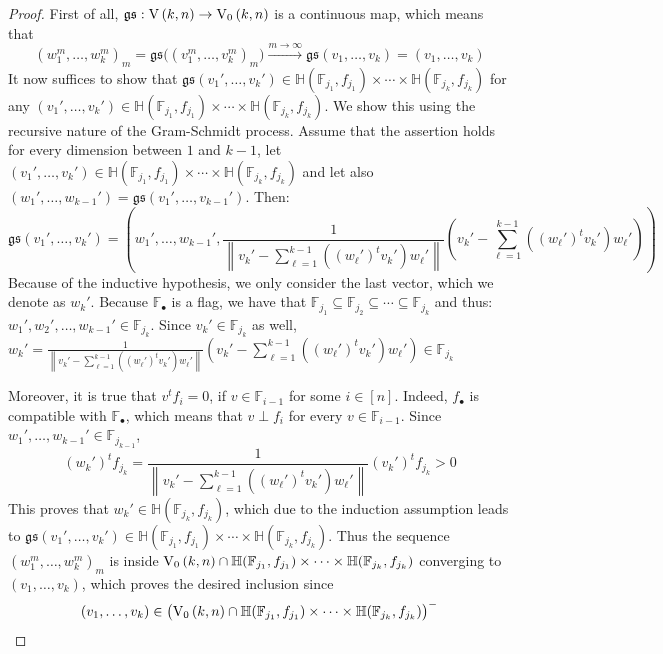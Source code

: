 \begin{proof}
First of all, $\mathfrak{gs}:\St{k}{n}\to\StO{k}{n}$ is a continuous map, which means that
\[{(w_1^m,\ldots,w_k^m)}_m=\mathfrak{gs}\big({(v_1^m,\ldots,v_k^m)}_m\big)\overset{m\to\infty}{\to}\mathfrak{gs}(v_1,\ldots,v_k)=(v_1,\ldots,v_k)\]
It now suffices to show that $\mathfrak{gs}(v_1',\ldots,v_k')\in\mathbb{H}(\mathbb{F}_{j_1},f_{j_1})\times\cdots\times\mathbb{H}(\mathbb{F}_{j_k},f_{j_k})$ for any $(v_1',\ldots,v_k')\in\mathbb{H}(\mathbb{F}_{j_1},f_{j_1})\times\cdots\times\mathbb{H}(\mathbb{F}_{j_k},f_{j_k})$. We show this using the recursive nature of the Gram-Schmidt process. Assume that the assertion holds for every dimension between $1$ and $k-1$, let $(v_1',\ldots,v_k')\in\mathbb{H}(\mathbb{F}_{j_1},f_{j_1})\times\cdots\times\mathbb{H}(\mathbb{F}_{j_k},f_{j_k})$ and let also $(w_1',\ldots,w_{k-1}')=\mathfrak{gs}(v_1',\ldots,v_{k-1}')$. Then:
\[\mathfrak{gs}(v_1',\ldots,v_k')=\left(w_1',\ldots,w_{k-1}',\frac{1}{\left\|v_k'-\sum_{\ell=1}^{k-1}((w_{\ell}')^t v_k')w_{\ell}'\right\|}\left(v_k'-\sum_{\ell=1}^{k-1}((w_{\ell}')^tv_k')w_{\ell}'\right)\right)\]
Because of the inductive hypothesis, we only consider the last vector, which we denote as $w_k'$. Because $\mathbb{F}_{\bullet}$ is a flag, we have that $\mathbb{F}_{j_1}\subseteq\mathbb{F}_{j_2}\subseteq\cdots\subseteq\mathbb{F}_{j_k}$ and thus: $w_1',w_2',\ldots,w_{k-1}'\in\mathbb{F}_{j_k}$. Since $v_k'\in\mathbb{F}_{j_k}$ as well,
$w_k'=\frac{1}{\left\|v_k'-\sum_{\ell=1}^{k-1}((w_{\ell}')^tv_k')w_{\ell}'\right\|}\left(v_k'-\sum_{\ell=1}^{k-1}((w_{\ell}')^t v_k')w_{\ell}'\right)\in\mathbb{F}_{j_k}$

Moreover, it is true that $v^tf_i=0$, if $v\in\mathbb{F}_{i-1}$ for some $i\in[n]$. Indeed, $f_{\bullet}$ is compatible with $\mathbb{F}_{\bullet}$, which means that $v\perp f_i$ for every $v\in\mathbb{F}_{i-1}$. Since $w_1',\ldots,w_{k-1}'\in\mathbb{F}_{j_{k-1}}$,
\[(w_k')^tf_{j_k}=\frac{1}{\left\|v_k'-\sum_{\ell=1}^{k-1}((w_{\ell}')^tv_k')w_{\ell}'\right\|}(v_k')^tf_{j_k}>0\]
This proves that $w_k'\in\mathbb{H}(\mathbb{F}_{j_k},f_{j_k})$, which due to the induction assumption leads to
$\mathfrak{gs}(v_1',\ldots,v_k')\in\mathbb{H}(\mathbb{F}_{j_1},f_{j_1})\times\cdots\times\mathbb{H}(\mathbb{F}_{j_k},f_{j_k})$.
Thus the sequence ${(w_1^m,\ldots,w_k^m)}_m$ is inside $\StO{k}{n}\cap\mathbb{H}(\mathbb{F}_{j_1},f_{j_1})\times\cdots\times\mathbb{H}(\mathbb{F}_{j_k},f_{j_k})$ converging to $(v_1,\ldots,v_k)$, which proves the desired inclusion since
\[(v_1,\ldots,v_k)\in{\big(\StO{k}{n}\cap\mathbb{H}(\mathbb{F}_{j_1},f_{j_1})\times\cdots\times\mathbb{H}(\mathbb{F}_{j_k},f_{j_k})\big)}^-\qedhere\]
\end{proof}

